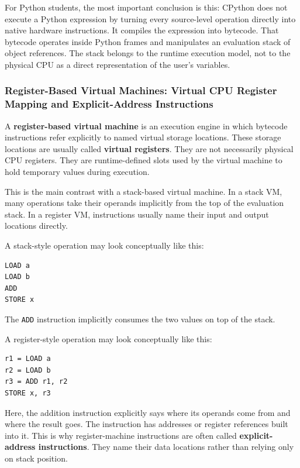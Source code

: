 For Python students, the most important conclusion is this: CPython does not execute a Python expression by turning every source-level operation directly into native hardware instructions. It compiles the expression into bytecode. That bytecode operates inside Python frames and manipulates an evaluation stack of object references. The stack belongs to the runtime execution model, not to the physical CPU as a direct representation of the user's variables.





\subsubsection{Register-Based Virtual Machines: Virtual CPU Register Mapping and Explicit-Address Instructions}

A \textbf{register-based virtual machine} is an execution engine in which bytecode instructions refer explicitly to named virtual storage locations. These storage locations are usually called \textbf{virtual registers}. They are not necessarily physical CPU registers. They are runtime-defined slots used by the virtual machine to hold temporary values during execution.

This is the main contrast with a stack-based virtual machine. In a stack VM, many operations take their operands implicitly from the top of the evaluation stack. In a register VM, instructions usually name their input and output locations directly.

A stack-style operation may look conceptually like this:

\begin{verbatim}
LOAD a
LOAD b
ADD
STORE x
\end{verbatim}

The \texttt{ADD} instruction implicitly consumes the two values on top of the stack.

A register-style operation may look conceptually like this:

\begin{verbatim}
r1 = LOAD a
r2 = LOAD b
r3 = ADD r1, r2
STORE x, r3
\end{verbatim}

Here, the addition instruction explicitly says where its operands come from and where the result goes. The instruction has addresses or register references built into it. This is why register-machine instructions are often called \textbf{explicit-address instructions}. They name their data locations rather than relying only on stack position.


